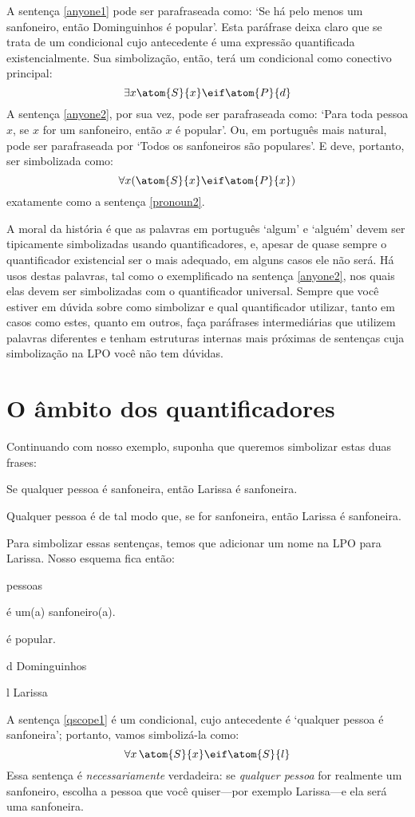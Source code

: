 A sentença \ref{anyone1} pode ser parafraseada como: `Se há pelo menos um sanfoneiro, então Dominguinhos é popular'.
Esta paráfrase deixa claro que se trata de um condicional cujo antecedente é uma expressão quantificada existencialmente.
Sua simbolização, então, terá um condicional como conectivo principal:
$$\exists x \atom{S}{x} \eif \atom{P}{d}$$
A sentença \ref{anyone2}, por sua vez, pode ser parafraseada como:
`Para toda pessoa $x$, se $x$ for um sanfoneiro, então $x$ é popular'.
Ou, em português mais natural, pode ser parafraseada por `Todos os sanfoneiros são populares'.
E deve, portanto, ser simbolizada como:
$$\forall x(\atom{S}{x} \eif \atom{P}{x})$$
exatamente como a sentença \ref{pronoun2}.

A moral da história é que as palavras em português `algum' e `alguém' devem ser tipicamente simbolizadas usando quantificadores, e, apesar de quase sempre o quantificador existencial ser o mais adequado, em alguns casos ele não será.
Há usos destas palavras, tal como o exemplificado na sentença \ref{anyone2}, nos quais elas devem ser simbolizadas com o quantificador universal.
Sempre que você estiver em dúvida sobre como simbolizar e qual quantificador utilizar, tanto em casos como estes, quanto em outros, faça paráfrases intermediárias que utilizem palavras diferentes e tenham estruturas internas mais próximas de sentenças cuja simbolização na LPO você não tem dúvidas.


\section{O âmbito dos quantificadores}
Continuando com nosso exemplo, suponha que queremos simbolizar estas duas frases:
	\begin{earg}
		\item[\ex{qscope1}] Se qualquer pessoa é sanfoneira, então Larissa é sanfoneira.
		\item[\ex{qscope2}] Qualquer pessoa é de tal modo que, se for sanfoneira, então Larissa é  sanfoneira.
	\end{earg}
Para simbolizar essas sentenças, temos que adicionar um nome na LPO para Larissa.
Nosso esquema fica então:
	\begin{center}
	\begin{ekey}
		\item[\text{domínio}] pessoas
		\item[\atom{S}{x}]  é um(a) sanfoneiro(a).
		\item[\atom{P}{x}]  é popular.
		\item[d] Dominguinhos
		\item[l] Larissa
	\end{ekey}
	\end{center}
A sentença \ref{qscope1} é um condicional, cujo antecedente é `qualquer pessoa é sanfoneira'; portanto, vamos simbolizá-la como:
$$\forall x\, \atom{S}{x} \eif \atom{S}{l}$$
Essa sentença é \emph{necessariamente} verdadeira:
se \emph{qualquer pessoa} for realmente um sanfoneiro, escolha a pessoa que você quiser---por exemplo Larissa---e ela será uma sanfoneira.

